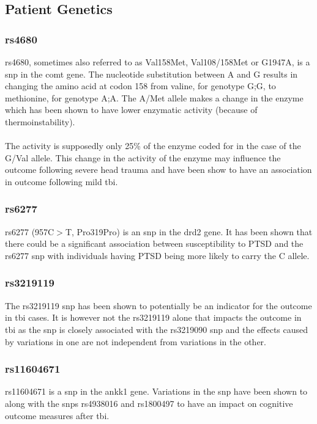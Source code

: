 \documentclass[11pt]{article}
\begin{document}
\subsection{Patient Genetics}

\subsubsection{rs4680}
rs4680, sometimes also referred to as Val158Met, Val108/158Met or G1947A, is a \gls{snp} in the \gls{comt} gene. The nucleotide substitution between A and G results in changing the amino acid at codon 158 from valine, for genotype G;G, to methionine, for genotype A;A. The A/Met allele makes a change in the enzyme which has been shown to have lower enzymatic activity (because of thermoinstability).\cite{Rs46802020}\\
\\
The activity is supposedly only 25\% of the enzyme coded for in the case of the G/Val allele\cite{Rs4680SNPedia}. This change in the activity of the enzyme may influence the outcome following severe head trauma and have been show to have an association in outcome following mild \gls{tbi}.\cite{winklerCOMTVal1582016}

\subsubsection{rs6277}
rs6277 (957C$>$T, Pro319Pro) is an \gls{snp} in the \gls{drd2} gene\cite{Rs6277SNPedia}. It has been shown that there could be a significant association between susceptibility to PTSD and the rs6277 \gls{snp} with individuals having PTSD being more likely to carry the C allele\cite{voiseyDRD2Gene957C2009}.
\subsubsection{rs3219119}
The rs3219119 \gls{snp} has been shown to potentially be an indicator for the outcome in \gls{tbi} cases. It is however not the rs3219119 alone that impacts the outcome in \gls{tbi} as the \gls{snp} is closely associated with the rs3219090 \gls{snp} and the effects caused by variations in one are not independent from variations in the other.\cite{sarnaikInfluencePARP1Polymorphisms2010}

\subsubsection{rs11604671}
rs11604671 is a \gls{snp} in the \gls{ankk1} gene\cite{Rs11604671SNPedia}. Variations in the \gls{snp} have been shown to along with the \glspl{snp} rs4938016 and rs1800497 to have an impact on cognitive outcome measures after \gls{tbi}.\cite{mcallisterSingleNucleotidePolymorphisms2008a}
\end{document}
